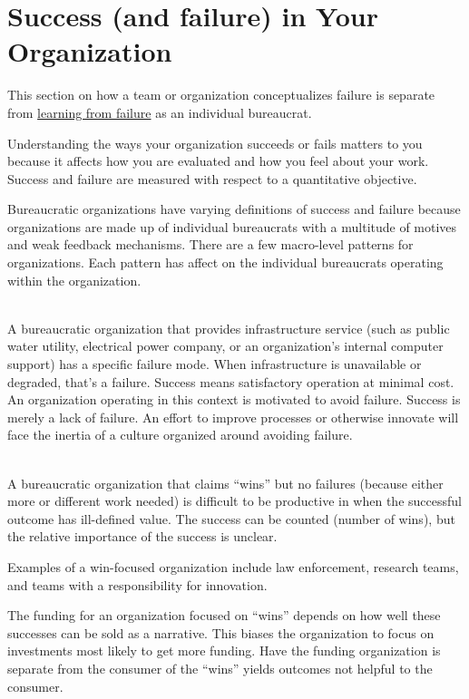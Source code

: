 \section{Success (and failure) in Your Organization\label{sec:org-failure-and-success}}

This section on how a team or organization conceptualizes failure is separate from %
\hyperref[sec:learn-from-failure]{learning from failure} 
as an individual bureaucrat. 

Understanding the ways your organization succeeds or fails matters to you because it affects how you are evaluated and how you feel about your work. Success and failure are measured with respect to a quantitative objective. 


Bureaucratic organizations have varying definitions of success and failure because organizations are made up of individual bureaucrats with a multitude of motives and weak feedback mechanisms. There are a few macro-level patterns for organizations. Each pattern has affect on the individual bureaucrats operating within the organization. 

\ \\

A bureaucratic organization that provides infrastructure service (such as public water utility, electrical power company, or an organization's internal computer support) has a specific failure mode. When infrastructure is unavailable or degraded, that's a failure. Success means satisfactory operation at minimal cost. An organization operating in this context is motivated to avoid failure. Success is merely a lack of failure. An effort to improve processes or otherwise innovate will face the inertia of a culture organized around avoiding failure. 

\ \\

A bureaucratic organization that claims ``wins'' but no failures (because either more or different work needed) is difficult to be productive in when the successful outcome has ill-defined value. The success can be counted (number of wins), but the relative importance of the success is unclear.

Examples of a win-focused organization include law enforcement, research teams, and teams with a responsibility for innovation. 

The funding for an organization focused on ``wins'' depends on how well these successes can be sold as a narrative. This biases the organization to focus on investments most likely to get more funding. Have the funding organization is separate from the consumer of the ``wins'' yields outcomes not helpful to the consumer.

\ \\

